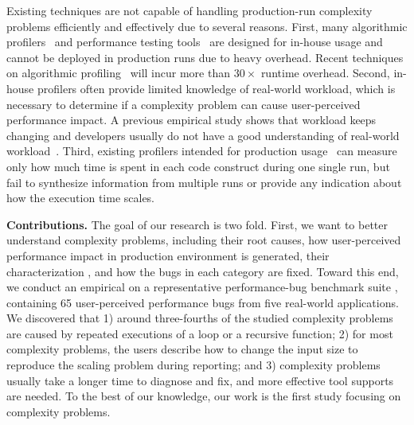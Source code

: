 {\color{red} Existing techniques} 
are not capable of handling production-run complexity problems
efficiently and effectively due to several reasons. 
First, many algorithmic profilers~\cite{Aprof1,Aprof2,AlgoProf} and performance 
testing tools~\cite{Alabama,PerfBlower} are designed for in-house usage and cannot be 
deployed in production runs due to heavy overhead. 
 
Recent techniques on algorithmic 
profiling~\cite{Aprof1,Aprof2,AlgoProf} will incur more than $30\times$ runtime overhead.
Second, in-house profilers often {\color{red} provide} limited knowledge of real-world workload, which is necessary 
to determine if a complexity problem can cause user-perceived performance 
impact. A previous empirical study shows that workload keeps changing and 
developers usually do not have a good understanding of real-world workload~\citep{PerfBug}.  
Third, existing profilers intended for production usage~\cite{gprof,oprofile,LagHunter,IntroPerf}
can measure only how much time 
is spent in each code construct during one single run,
but fail to synthesize information from multiple runs
or provide any indication about how the execution time scales.
 


\noindent\textbf{Contributions.}
\label{sec:con}
%
The goal of our research is two fold. First, we want to better 
understand  complexity problems, including 
their root causes, how user-perceived performance impact 
in production environment is generated,
their characterization , 
and how the bugs in each category are
fixed.  Toward this end, 
we conduct an empirical on a representative
performance-bug benchmark suite \cite{PerfBug,SongOOPSLA2014},
containing 65 user-perceived  performance bugs from five
real-world applications.  We discovered that 
1) around three-fourths of the studied complexity problems are
caused by repeated executions of a loop or a recursive function;
2) for most complexity problems,
the users describe how to change the input size to reproduce the scaling problem during reporting;
and 3) complexity problems usually take a longer time to diagnose and fix,
and more effective tool supports are needed. 
To the best of our knowledge, our work is the first study focusing on complexity problems.



